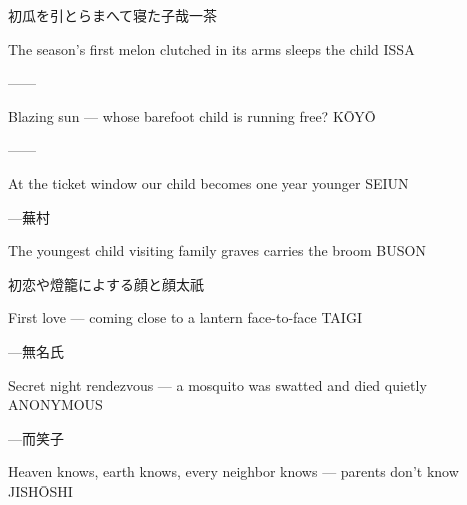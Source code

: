 \begin{haiku}
    {\FH 初瓜を引とらまへて寝た子哉}\hfill{\FH 一茶}

    \vin{} The season's first melon
    \vin{} \vin{} clutched in its arms
    \vin{} \vin{} \vin{} sleeps the child \hspace{\fill} ISSA
\end{haiku}

\begin{haiku}
    ---\hfill{---}

    \vin{} Blazing sun ---
    \vin{} \vin{} whose barefoot child
    \vin{} \vin{} \vin{} is running free? \hspace{\fill} K\={O}Y\={O}
\end{haiku}

\begin{haiku}
    ---\hfill{---}

    \vin{} At the ticket window
    \vin{} \vin{} our child becomes
    \vin{} \vin{} \vin{} one year younger \hspace{\fill} SEIUN
\end{haiku}

\begin{haiku}
    {---}\hfill{\FH 蕪村}

    \vin{} The youngest child
    \vin{} \vin{} visiting family graves
    \vin{} \vin{} \vin{} carries the broom \hspace{\fill} BUSON
\end{haiku}

\begin{haiku}
    {\FH 初恋や燈籠によする顔と顔}\hfill{\FH 太祇}

    \vin{} First love ---
    \vin{} \vin{} coming close to a lantern
    \vin{} \vin{} \vin{} face-to-face \hspace{\fill} TAIGI
\end{haiku}

\begin{haiku}
    {---}\hfill{\FH 無名氏}

    \vin{} Secret night rendezvous ---
    \vin{} \vin{} a mosquito was swatted
    \vin{} \vin{} \vin{} and died quietly \hspace{\fill} ANONYMOUS
\end{haiku}

\begin{haiku}
    {---}\hfill{\FH 而笑子}

    \vin{} Heaven knows,
    \vin{} \vin{} earth knows, every neighbor knows ---
    \vin{} \vin{} \vin{} parents don't know \hspace{\fill} JISH\={O}SHI
\end{haiku}

